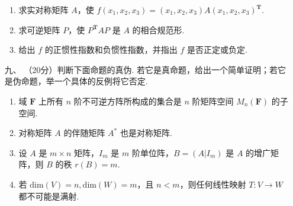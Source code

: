 \begin{enumerate}
\begin{enumerate}[label=(\arabic*)]
        \item 求实对称矩阵 $A$，使 $f(x_1,x_2,x_3)=(x_1,x_2,x_3)A(x_1,x_2,x_3)^{\mathbf{T}}.$
        \item 求可逆矩阵 $P$，使 $P^\mathbf{T}AP$ 是 $A$ 的相合规范形.
        \item 给出 $f$ 的正惯性指数和负惯性指数，并指出 $f$ 是否正定或负定.
    \end{enumerate}
    \item [九、]（20分）判断下面命题的真伪. 若它是真命题，给出一个简单证明；若它是伪命题，举一个具体的反例将它否定.
    \begin{enumerate}[label=(\arabic*)]
        \item 域 $\mathbf{F}$ 上所有 $n$ 阶不可逆方阵所构成的集合是 $n$ 阶矩阵空间 $M_n(\mathbf{F})$ 的子空间.
        \item 对称矩阵 $A$ 的伴随矩阵 $A^*$ 也是对称矩阵.
        \item 设 $A$ 是 $m\times n$ 矩阵，$I_m$ 是 $m$ 阶单位阵，$B=(A|I_m)$ 是 $A$ 的增广矩阵，则 $B$ 的秩 $r(B)=m.$
        \item 若 $\mathrm{dim}(V) = n,\mathrm{dim}(W) = m$，且 $n < m$，则任何线性映射 $T:V\to W$ 都不可能是满射.
    \end{enumerate}
\end{enumerate}

\clearpage
